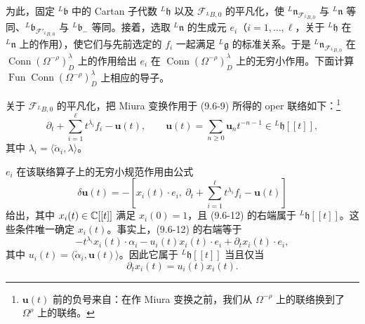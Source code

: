 为此，固定 ${}^L\mathfrak{b}$ 中的 Cartan 子代数 ${}^L\mathfrak{h}$ 以及 $\mathcal{F}_{{}^LB,0}$ 的平凡化，使 ${}^L\mathfrak{n}_{\mathcal{F}_{{}^LB,0}}$ 与 ${}^L\mathfrak{n}$ 等同、${}^L\mathfrak{b}_{\mathcal{F}'_{{}^LB,0}}$ 与 ${}^L\mathfrak{b}_-$ 等同。接着，选取 ${}^L\mathfrak{n}$ 的生成元 $e_i$（$i=1,\dots,\ell$，关于 ${}^L\mathfrak{h}$ 在 ${}^L\mathfrak{n}$ 上的作用），使它们与先前选定的 $f_i$ 一起满足 ${}^L\mathfrak{g}$ 的标准关系。于是 ${}^L\mathfrak{n}_{\mathcal{F}_{{}^LB,0}}$ 在 $\operatorname{Conn}(\Omega^{-\rho})^\lambda_D$ 上的作用给出 $e_i$ 在 $\operatorname{Conn}(\Omega^{-\rho})^\lambda_D$ 上的无穷小作用。下面计算 $\operatorname{Fun}\operatorname{Conn}(\Omega^{-\rho})^\lambda_D$ 上相应的导子。

关于 $\mathcal{F}_{{}^LB,0}$ 的平凡化，把 Miura 变换作用于 (9.6-9) 所得的 oper 联络如下：\footnote{$\mathbf{u}(t)$ 前的负号来自：在作 Miura 变换之前，我们从 $\Omega^{-\rho}$ 上的联络换到了 $\Omega^{\rho}$ 上的联络。}
\begin{equation}
    \partial_t+\sum_{i=1}^{\ell}t^{\lambda_i}f_i-\mathbf{u}(t),
    \qquad
    \mathbf{u}(t)=\sum_{n\ge0}\mathbf{u}_nt^{-n-1}\in{}^L\mathfrak{h}[[t]],
    \tag{9.6-11}
\end{equation}
其中 $\lambda_i=\langle\check\alpha_i,\lambda\rangle$。

$e_i$ 在该联络算子上的无穷小规范作用由公式
\begin{equation}
    \delta\mathbf{u}(t)=-\left[x_i(t)\cdot e_i,\ \partial_t+\sum_{i=1}^{\ell}t^{\lambda_i}f_i-\mathbf{u}(t)\right]
    \tag{9.6-12}
\end{equation}
给出，其中 $x_i(t)\in\mathbb{C}[[t]]$ 满足 $x_i(0)=1$，且 (9.6-12) 的右端属于 ${}^L\mathfrak{h}[[t]]$。这些条件唯一确定 $x_i(t)$。事实上，(9.6-12) 的右端等于
\[
    -t^{\lambda_i}x_i(t)\cdot\alpha_i-u_i(t)x_i(t)\cdot e_i+\partial_tx_i(t)\cdot e_i,
\]
其中 $u_i(t)=\langle\check\alpha_i,\mathbf{u}(t)\rangle$。因此它属于 ${}^L\mathfrak{h}[[t]]$ 当且仅当
\begin{equation}
    \partial_tx_i(t)=u_i(t)x_i(t).
    \tag{9.6-13}
\end{equation}


